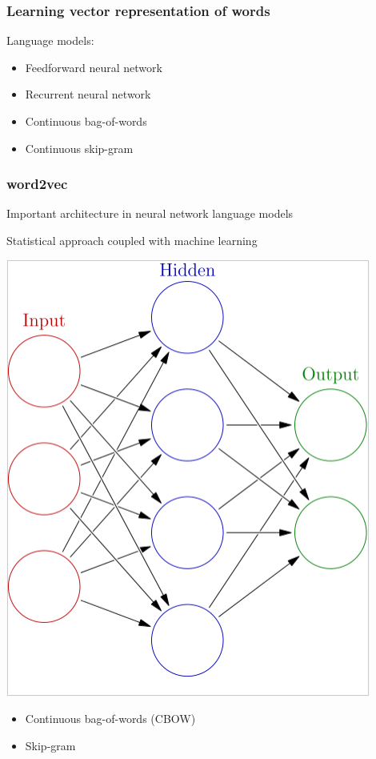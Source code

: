 \documentclass{beamer}   %
\begin{document}

\begin{frame}[t]
\frametitle{Learning vector representation of words}
    Language models: \par
    \begin{itemize}
        \item Feedforward neural network
        \item Recurrent neural network
        \item Continuous bag-of-words
        \item Continuous skip-gram 
    \end{itemize}
\end{frame}


\begin{frame}[t]
\frametitle{word2vec}
    Important architecture in neural network language models \par
    Statistical approach coupled with machine learning \par
    \begin{center}
        \includegraphics[scale=0.2]{nn}
    \end{center}
    \begin{itemize}
        \item Continuous bag-of-words (CBOW) 
        \item Skip-gram 
    \end{itemize}
\end{frame}
\end{document}
